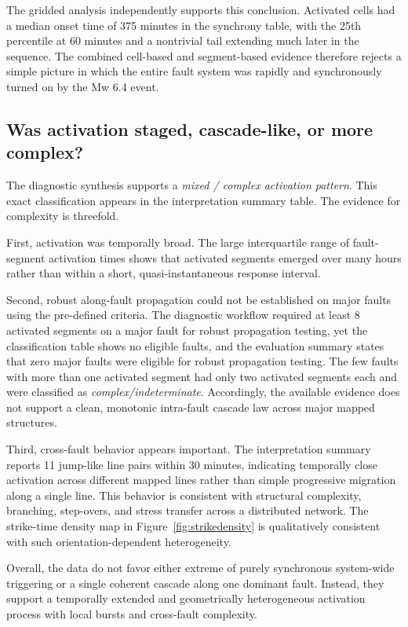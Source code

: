 \documentclass[11pt]{article}
\begin{document}
The gridded analysis independently supports this conclusion. Activated cells had a median onset time of 375 minutes in the synchrony table, with the 25th percentile at 60 minutes and a nontrivial tail extending much later in the sequence. The combined cell-based and segment-based evidence therefore rejects a simple picture in which the entire fault system was rapidly and synchronously turned on by the Mw 6.4 event.

\subsection{Was activation staged, cascade-like, or more complex?}
The diagnostic synthesis supports a \emph{mixed / complex activation pattern}. This exact classification appears in the interpretation summary table. The evidence for complexity is threefold.

First, activation was temporally broad. The large interquartile range of fault-segment activation times shows that activated segments emerged over many hours rather than within a short, quasi-instantaneous response interval.

Second, robust along-fault propagation could not be established on major faults using the pre-defined criteria. The diagnostic workflow required at least 8 activated segments on a major fault for robust propagation testing, yet the classification table shows no eligible faults, and the evaluation summary states that zero major faults were eligible for robust propagation testing. The few faults with more than one activated segment had only two activated segments each and were classified as \emph{complex/indeterminate}. Accordingly, the available evidence does not support a clean, monotonic intra-fault cascade law across major mapped structures.

Third, cross-fault behavior appears important. The interpretation summary reports 11 jump-like line pairs within 30 minutes, indicating temporally close activation across different mapped lines rather than simple progressive migration along a single line. This behavior is consistent with structural complexity, branching, step-overs, and stress transfer across a distributed network. The strike-time density map in Figure~\ref{fig:strikedensity} is qualitatively consistent with such orientation-dependent heterogeneity.

Overall, the data do not favor either extreme of purely synchronous system-wide triggering or a single coherent cascade along one dominant fault. Instead, they support a temporally extended and geometrically heterogeneous activation process with local bursts and cross-fault complexity.
\end{document}

